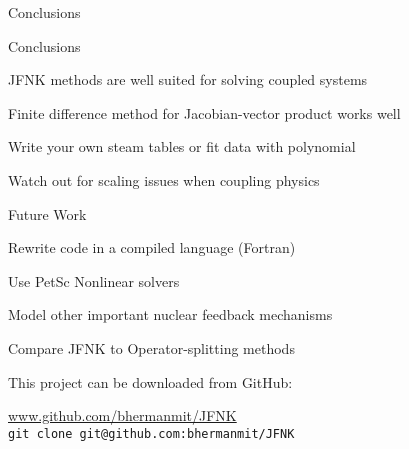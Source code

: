 \documentclass{beamer}
\begin{document}
\begin{section}{Conclusions}
\begin{frame}{Conclusions}
  \begin{customlist}{2ex}{0pt}
    \item JFNK methods are well suited for solving coupled systems
    \vfill\item Finite difference method for Jacobian-vector product works well
    \vfill\item Write your own steam tables or fit data with polynomial
    \vfill\item Watch out for scaling issues when coupling physics
  \end{customlist}
\end{frame}
\begin{frame}{Future Work}
  \begin{customlist}{2ex}{0pt}
    \item Rewrite code in a compiled language (Fortran)
    \vfill\item Use PetSc Nonlinear solvers
    \vfill\item Model other important nuclear feedback mechanisms
    \vfill\item Compare JFNK to Operator-splitting methods
    \vfill\item This project can be downloaded from GitHub:
    \begin{center}
      \url{www.github.com/bhermanmit/JFNK} \\
      \tt{git clone git@github.com:bhermanmit/JFNK}
    \end{center}
  \end{customlist}
\end{frame}
\end{section}
\end{document}
